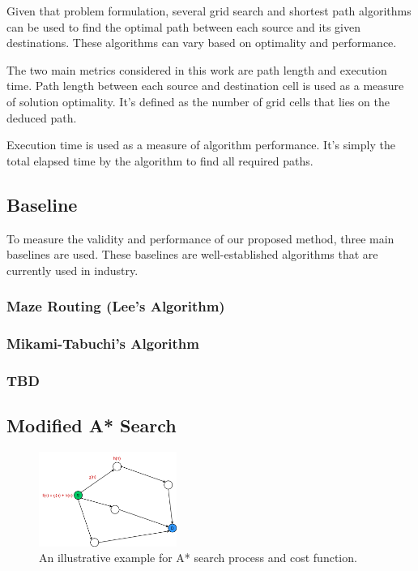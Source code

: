 Given that problem formulation, several grid search and shortest path algorithms can be used to find the optimal path between each source and its given destinations. These algorithms can vary based on optimality and performance.

The two main metrics considered in this work are path length and execution time. Path length between each source and destination cell is used as a measure of solution optimality. It's defined as the number of grid cells that lies on the deduced path.

Execution time is used as a measure of algorithm performance. It's simply the total elapsed time by the algorithm to find all required paths.

\subsection{Baseline}
To measure the validity and performance of our proposed method, three main baselines are used. These baselines are well-established algorithms that are currently used in industry.

\subsubsection{Maze Routing (Lee's Algorithm)}

\subsubsection{Mikami-Tabuchi’s Algorithm}

\subsubsection{TBD}

\subsection{Modified A* Search}
\begin{figure}[hp]
    \centering
    \includegraphics[width=0.4\textwidth]{figures/a_star.png}
    \caption{An illustrative example for A* search process and cost function.}
    \label{fig:astar}
\end{figure}

